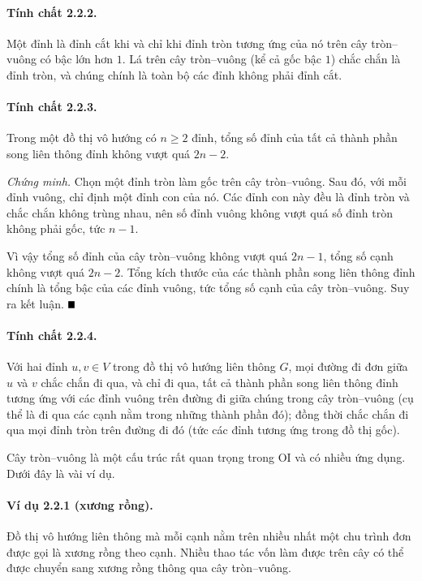 \documentclass[11pt]{article}
\providecommand{\square}{\mathord{\vcenter{\hrule height .6em width .6em}}}
\begin{document}
\paragraph{Tính chất 2.2.2.}
Một đỉnh là đỉnh cắt khi và chỉ khi đỉnh tròn tương ứng của nó trên cây
tròn--vuông có bậc lớn hơn $1$. Lá trên cây tròn--vuông (kể cả gốc bậc $1$)
chắc chắn là đỉnh tròn, và chúng chính là toàn bộ các đỉnh không phải đỉnh cắt.

\paragraph{Tính chất 2.2.3.}
Trong một đồ thị vô hướng có $n\ge2$ đỉnh, tổng số đỉnh của tất cả thành phần
song liên thông đỉnh không vượt quá $2n-2$.

\emph{Chứng minh.}
Chọn một đỉnh tròn làm gốc trên cây tròn--vuông. Sau đó, với mỗi đỉnh vuông, chỉ
định một đỉnh con của nó. Các đỉnh con này đều là đỉnh tròn và chắc chắn không
trùng nhau, nên số đỉnh vuông không vượt quá số đỉnh tròn không phải gốc, tức
$n-1$.

Vì vậy tổng số đỉnh của cây tròn--vuông không vượt quá $2n-1$, tổng số cạnh
không vượt quá $2n-2$. Tổng kích thước của các thành phần song liên thông đỉnh
chính là tổng bậc của các đỉnh vuông, tức tổng số cạnh của cây tròn--vuông. Suy
ra kết luận. \hfill$\square$

\paragraph{Tính chất 2.2.4.}
Với hai đỉnh $u,v\in V$ trong đồ thị vô hướng liên thông $G$, mọi đường đi đơn
giữa $u$ và $v$ chắc chắn đi qua, và chỉ đi qua, tất cả thành phần song liên
thông đỉnh tương ứng với các đỉnh vuông trên đường đi giữa chúng trong cây
tròn--vuông (cụ thể là đi qua các cạnh nằm trong những thành phần đó); đồng thời
chắc chắn đi qua mọi đỉnh tròn trên đường đi đó (tức các đỉnh tương ứng trong
đồ thị gốc).

Cây tròn--vuông là một cấu trúc rất quan trọng trong OI và có nhiều ứng dụng.
Dưới đây là vài ví dụ.

\paragraph{Ví dụ 2.2.1 (xương rồng).}
Đồ thị vô hướng liên thông mà mỗi cạnh nằm trên nhiều nhất một chu trình đơn
được gọi là xương rồng theo cạnh. Nhiều thao tác vốn làm được trên cây có thể
được chuyển sang xương rồng thông qua cây tròn--vuông.
\end{document}
